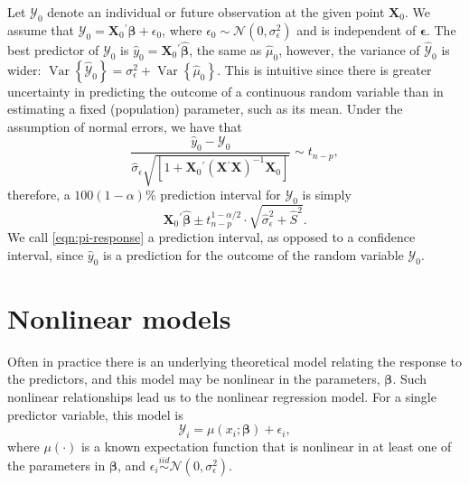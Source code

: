 \documentclass[cmfont,usenames,dvipsnames,leqno]{afit-etd}\usepackage[]{graphicx}\usepackage[]{color}
\newcommand{\trans}{\ensuremath{^\prime}}
\newcommand{\mc}[1]{\ensuremath{\mathcal{#1}}}
\newcommand{\wh}[1]{\ensuremath{\widehat{#1}}}
\newcommand{\var}{\operatorname{Var}}
\newcommand{\X}{\ensuremath{\bm{X}}}
\begin{document}
Let $\mc{Y}_0$ denote an individual or future observation at the given point $\X_0$. We assume that $\mc{Y}_0 = \X_0\trans\bm{\beta} + \epsilon_0$, where $\epsilon_0 \sim \mc{N}(0, \sigma_\epsilon^2)$ and is independent of $\bm{\epsilon}$. The best predictor of $\mc{Y}_0$ is $\widehat{y}_0 = \X_0\trans\wh{\bm{\beta}}$, the same as $\wh{\mu}_0$, however, the variance of $\widehat{\mc{Y}}_0$ is wider: $\var\left\{\widehat{\mc{Y}}_0\right\} = \sigma_\epsilon^2 + \var\left\{\wh{\mu}_0\right\}$. This is intuitive since there is greater uncertainty in predicting the outcome of a continuous random variable than in estimating a fixed (population) parameter, such as its mean. Under the assumption of normal errors, we have that
\begin{equation*}
  \frac{\widehat{y}_0 - \mc{Y}_0}{\wh{\sigma}_\epsilon\sqrt{\left[1 + \X_0\trans \left( \X\trans\X \right)^{-1} \X_0 \right]}} \sim t_{n - p},
\end{equation*}
therefore, a $100(1 - \alpha)\%$ prediction interval for $\mc{Y}_0$ is simply
\begin{equation}
\label{eqn:pi-response}
  \X_0\trans\wh{\bm{\beta}} \pm t_{n - p}^{1 - \alpha/2}  \cdot  \sqrt{\wh{\sigma}_\epsilon^2 + \widehat{S}^2}.
\end{equation}
We call \eqref{eqn:pi-response} a prediction interval, as opposed to a confidence interval, since $\widehat{y}_0$ is a prediction for the outcome of the random variable $\mc{Y}_0$.

\section{Nonlinear models}
\label{sec:nonlinear-models}
Often in practice there is an underlying theoretical model relating the response to the predictors, and this model may be nonlinear in the parameters, $\bm{\beta}$. Such nonlinear relationships lead us to the nonlinear regression model. For a single predictor variable, this model is
\begin{equation}
\label{eqn:nonlinemod}
  \mc{Y}_i = \mu(x_i; \bm{\beta}) + \epsilon_i,
\end{equation}
where $\mu(\cdot)$ is a known expectation function that is nonlinear in at least one of the parameters in $\bm{\beta}$, and $\epsilon_i \stackrel{iid}{\sim} \mc{N}(0, \sigma_\epsilon^2)$.
\end{document}

